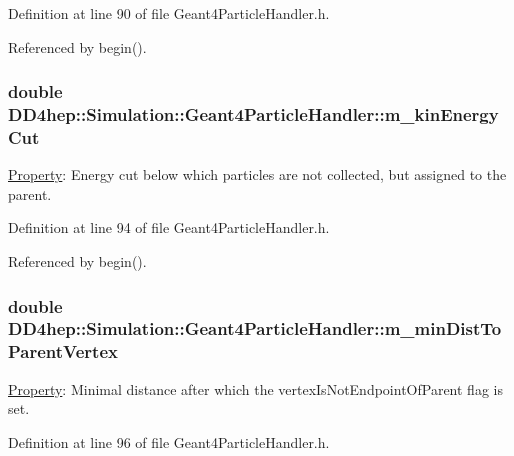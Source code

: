 Definition at line 90 of file Geant4ParticleHandler.h.

Referenced by begin().\hypertarget{class_d_d4hep_1_1_simulation_1_1_geant4_particle_handler_ad3d0abf4ae9bc3f3176d9f05dab96cf4}{
\subsubsection[{m\_\-kinEnergyCut}]{\setlength{\rightskip}{0pt plus 5cm}double {\bf DD4hep::Simulation::Geant4ParticleHandler::m\_\-kinEnergyCut}}}
\label{class_d_d4hep_1_1_simulation_1_1_geant4_particle_handler_ad3d0abf4ae9bc3f3176d9f05dab96cf4}


\hyperlink{class_d_d4hep_1_1_property}{Property}: Energy cut below which particles are not collected, but assigned to the parent. 

Definition at line 94 of file Geant4ParticleHandler.h.

Referenced by begin().\hypertarget{class_d_d4hep_1_1_simulation_1_1_geant4_particle_handler_ac60a7876123ba7481d080a4ef284a730}{
\subsubsection[{m\_\-minDistToParentVertex}]{\setlength{\rightskip}{0pt plus 5cm}double {\bf DD4hep::Simulation::Geant4ParticleHandler::m\_\-minDistToParentVertex}}}
\label{class_d_d4hep_1_1_simulation_1_1_geant4_particle_handler_ac60a7876123ba7481d080a4ef284a730}


\hyperlink{class_d_d4hep_1_1_property}{Property}: Minimal distance after which the vertexIsNotEndpointOfParent flag is set. 

Definition at line 96 of file Geant4ParticleHandler.h.

